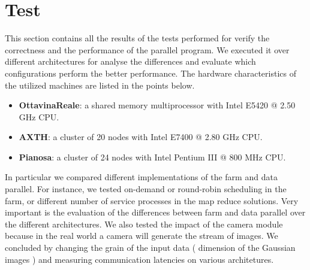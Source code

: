 \section{Test}

This section contains all the results of the tests performed for verify the correctness and the performance of the parallel program. We executed it over different architectures for analyse the differences and evaluate which configurations perform the better performance. The hardware characteristics of the utilized machines are listed in the points below. 
\begin{itemize}
\item \textbf{OttavinaReale}: a shared memory multiprocessor with Intel E5420 @ 2.50 GHz CPU.
\item \textbf{AXTH}: a cluster of 20 nodes with Intel E7400 @ 2.80 GHz CPU.
\item \textbf{Pianosa}: a cluster of 24 nodes with Intel Pentium III @ 800 MHz CPU.
\end{itemize}

In particular we compared different implementations of the farm and data parallel.
For instance, we tested on-demand or round-robin scheduling in the farm, or different number of service processes in the map reduce solutions.
Very important is the evaluation of the differences between farm and data parallel over the different architectures. 
We also tested the impact of the camera module because in the real world a camera will generate the stream of images.
We concluded by changing the grain of the input data ( dimension of the Gaussian images ) and measuring communication latencies on various architetures.

